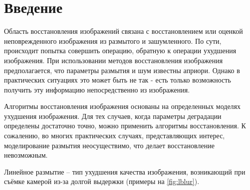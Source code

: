 

\usepackage{comment}





\tableofcontents

\newpage

\pagestyle{fancy}

\rhead{\thepage}
\fancyfoot{}

\section{Введение}

Область восстановления изображений связана с восстановлением или оценкой неповрежденного
изображения из размытого и зашумленного. По сути, происходит попытка совершить операцию, обратную к операции ухудшения изображения. При использовании методов восстановления изображения предполагается, что параметры размытия и шум известны априори. Однако в практических ситуациях это может быть не так - есть только возможность получить эту информацию непосредственно из изображения. 

Алгоритмы восстановления изображения основаны на определенных моделях ухудшения изображения.
Для тех случаев, когда параметры деградации определены достаточно точно, можно применить алгоритмы восстановления. К сожалению, во многих практических случаях, представляющих интерес,
моделирование размытия неосуществимо, что делает восстановление невозможным. 

Линейное размытие -- тип ухудшения качества изображения, возникающий при съёмке камерой из-за долгой выдержки (примеры на \ref{fig:lblur}).


